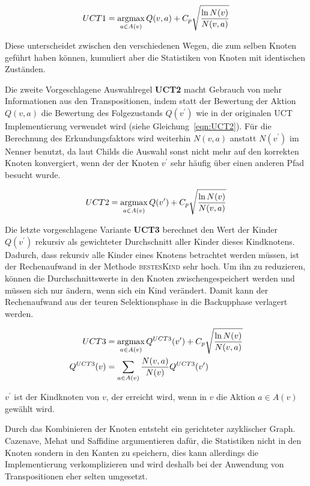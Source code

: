 \begin{equation}
UCT1 = \operatorname*{argmax}_{a \in A(v)} Q(v,a) + C_p\sqrt{\frac{\ln N(v)}{N(v,a)}}
\label{eqn:UCT1}
\end{equation}

Diese unterscheidet zwischen den verschiedenen Wegen, die zum selben Knoten geführt haben können, kumuliert aber die Statistiken von Knoten mit identischen Zuständen. 

Die zweite Vorgeschlagene Auswahlregel \textbf{UCT2} macht Gebrauch von mehr Informationen aus den Transpositionen, indem statt der Bewertung der Aktion $Q(v,a)$ die Bewertung des Folgezustands $Q(v^\prime)$ wie in der originalen UCT Implementierung verwendet wird (siehe Gleichung~\ref{eqn:UCT2}). Für die Berechnung des Erkundungsfaktors wird weiterhin $N(v,a)$ anstatt $N(v^\prime)$ im Nenner benutzt, da laut Childs die Auswahl sonst nicht mehr auf den korrekten Knoten konvergiert, wenn der der Knoten $v^\prime$ sehr häufig über einen anderen Pfad besucht wurde.\autocite[\ppno~390]{childsTranspositionsMoveGroups2008}

\begin{equation}
UCT2 = \operatorname*{argmax}_{a \in A(v)} Q(v^\prime) + C_p\sqrt{\frac{\ln N(v)}{N(v,a)}}
\label{eqn:UCT2}
\end{equation}

Die letzte vorgeschlagene Variante \textbf{UCT3} berechnet den Wert der Kinder $Q(v^\prime)$ rekursiv als gewichteter Durchschnitt aller Kinder dieses Kindknotens. Dadurch, dass rekursiv alle Kinder eines Knotens betrachtet werden müssen, ist der Rechenaufwand in der Methode \textsc{bestesKind} sehr hoch. Um ihn zu reduzieren, können die Durchschnittswerte in den Knoten zwischengespeichert werden und müssen sich nur ändern, wenn sich ein Kind verändert. Damit kann der Rechenaufwand aus der teuren Selektionsphase in die Backupphase verlagert werden.

\begin{equation}
\begin{split}
UCT3 & = \operatorname*{argmax}_{a \in A(v)}Q^{UCT3}(v^\prime) + C_p\sqrt{\frac{\ln N(v)}{N(v,a)}} \\
Q^{UCT3}(v) & = \sum_{a \in A(v)}\frac{N(v,a)}{N(v)}Q^{UCT3}(v^\prime)
\end{split}
\label{eqn:uct3}
\end{equation}

$v^\prime$ ist der Kindknoten von $v$, der erreicht wird, wenn in $v$ die Aktion $a \in A(v)$ gewählt wird.

Durch das Kombinieren der Knoten entsteht ein gerichteter azyklischer Graph. 
Cazenave, Mehat und Saffidine\autocite{cazenaveUCDUpperConfidence2012} argumentieren dafür, die Statistiken nicht in den Knoten sondern in den Kanten zu speichern, dies kann allerdings die Implementierung verkomplizieren und wird deshalb bei der Anwendung von Transpositionen eher selten umgesetzt.

